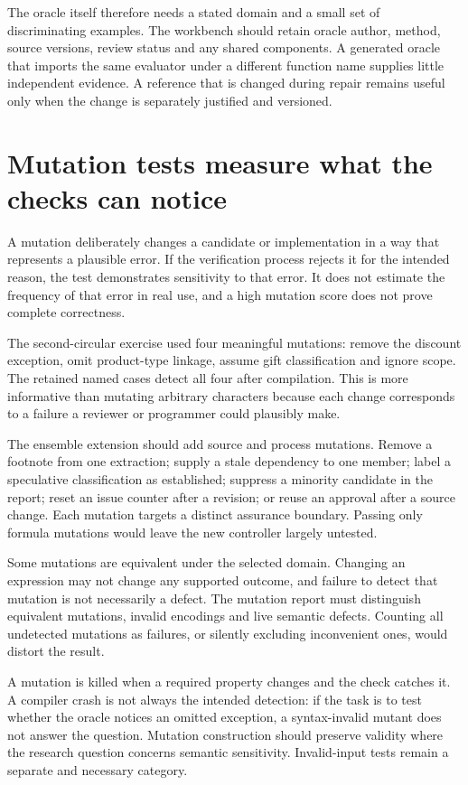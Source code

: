 The oracle itself therefore needs a stated domain and a small set of discriminating
examples. The workbench should retain oracle author, method, source versions,
review status and any shared components. A generated oracle that imports the same
evaluator under a different function name supplies little independent evidence.
A reference that is changed during repair remains useful only when the change is
separately justified and versioned.

\section{Mutation tests measure what the checks can notice}

A mutation deliberately changes a candidate or implementation in a way that
represents a plausible error. If the verification process rejects it for the
intended reason, the test demonstrates sensitivity to that error. It does not
estimate the frequency of that error in real use, and a high mutation score does
not prove complete correctness.

The second-circular exercise used four meaningful mutations: remove the discount
exception, omit product-type linkage, assume gift classification and ignore scope.
The retained named cases detect all four after compilation. This is more
informative than mutating arbitrary characters because each change corresponds
to a failure a reviewer or programmer could plausibly make.

The ensemble extension should add source and process mutations. Remove a footnote
from one extraction; supply a stale dependency to one member; label a speculative
classification as established; suppress a minority candidate in the report; reset
an issue counter after a revision; or reuse an approval after a source change.
Each mutation targets a distinct assurance boundary. Passing only formula
mutations would leave the new controller largely untested.

Some mutations are equivalent under the selected domain. Changing an expression
may not change any supported outcome, and failure to detect that mutation is not
necessarily a defect. The mutation report must distinguish equivalent mutations,
invalid encodings and live semantic defects. Counting all undetected mutations as
failures, or silently excluding inconvenient ones, would distort the result.

A mutation is killed when a required property changes and the check catches it.
A compiler crash is not always the intended detection: if the task is to test
whether the oracle notices an omitted exception, a syntax-invalid mutant does not
answer the question. Mutation construction should preserve validity where the
research question concerns semantic sensitivity. Invalid-input tests remain a
separate and necessary category.

